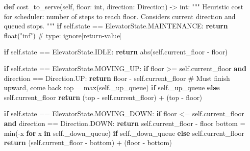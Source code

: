 \documentclass[11pt]{article}
\newenvironment{Shaded}{\begin{snugshade}}{\end{snugshade}}
\newcommand{\BuiltInTok}[1]{\textcolor[rgb]{0.50,0.55,0.55}{#1}}
\newcommand{\CommentTok}[1]{\textcolor[rgb]{0.48,0.49,0.49}{#1}}
\newcommand{\ControlFlowTok}[1]{\textcolor[rgb]{0.99,0.74,0.29}{\textbf{#1}}}
\newcommand{\KeywordTok}[1]{\textcolor[rgb]{0.81,0.81,0.76}{\textbf{#1}}}
\newcommand{\NormalTok}[1]{\textcolor[rgb]{0.81,0.81,0.76}{#1}}
\newcommand{\OperatorTok}[1]{\textcolor[rgb]{0.81,0.81,0.76}{#1}}
\newcommand{\StringTok}[1]{\textcolor[rgb]{0.96,0.31,0.31}{#1}}
\newcommand{\VariableTok}[1]{\textcolor[rgb]{0.15,0.68,0.68}{#1}}
\begin{document}
\begin{Shaded}
\begin{Highlighting}[]
    \KeywordTok{def}\NormalTok{ cost\_to\_serve(}\VariableTok{self}\NormalTok{, floor: }\BuiltInTok{int}\NormalTok{, direction: Direction) }\OperatorTok{{-}\textgreater{}} \BuiltInTok{int}\NormalTok{:}
        \CommentTok{"""}
\CommentTok{        Heuristic cost for scheduler: number of steps to reach \textasciigrave{}floor\textasciigrave{}.}
\CommentTok{        Considers current direction and queued stops.}
\CommentTok{        """}
        \ControlFlowTok{if} \VariableTok{self}\NormalTok{.state }\OperatorTok{==}\NormalTok{ ElevatorState.MAINTENANCE:}
            \ControlFlowTok{return} \BuiltInTok{float}\NormalTok{(}\StringTok{"inf"}\NormalTok{)  }\CommentTok{\# type: ignore[return{-}value]}

        \ControlFlowTok{if} \VariableTok{self}\NormalTok{.state }\OperatorTok{==}\NormalTok{ ElevatorState.IDLE:}
            \ControlFlowTok{return} \BuiltInTok{abs}\NormalTok{(}\VariableTok{self}\NormalTok{.current\_floor }\OperatorTok{{-}}\NormalTok{ floor)}

        \ControlFlowTok{if} \VariableTok{self}\NormalTok{.state }\OperatorTok{==}\NormalTok{ ElevatorState.MOVING\_UP:}
            \ControlFlowTok{if}\NormalTok{ floor }\OperatorTok{\textgreater{}=} \VariableTok{self}\NormalTok{.current\_floor }\KeywordTok{and}\NormalTok{ direction }\OperatorTok{==}\NormalTok{ Direction.UP:}
                \ControlFlowTok{return}\NormalTok{ floor }\OperatorTok{{-}} \VariableTok{self}\NormalTok{.current\_floor}
            \CommentTok{\# Must finish upward, come back}
\NormalTok{            top }\OperatorTok{=} \BuiltInTok{max}\NormalTok{(}\VariableTok{self}\NormalTok{.\_up\_queue) }\ControlFlowTok{if} \VariableTok{self}\NormalTok{.\_up\_queue }\ControlFlowTok{else} \VariableTok{self}\NormalTok{.current\_floor}
            \ControlFlowTok{return}\NormalTok{ (top }\OperatorTok{{-}} \VariableTok{self}\NormalTok{.current\_floor) }\OperatorTok{+}\NormalTok{ (top }\OperatorTok{{-}}\NormalTok{ floor)}

        \ControlFlowTok{if} \VariableTok{self}\NormalTok{.state }\OperatorTok{==}\NormalTok{ ElevatorState.MOVING\_DOWN:}
            \ControlFlowTok{if}\NormalTok{ floor }\OperatorTok{\textless{}=} \VariableTok{self}\NormalTok{.current\_floor }\KeywordTok{and}\NormalTok{ direction }\OperatorTok{==}\NormalTok{ Direction.DOWN:}
                \ControlFlowTok{return} \VariableTok{self}\NormalTok{.current\_floor }\OperatorTok{{-}}\NormalTok{ floor}
\NormalTok{            bottom }\OperatorTok{=} \BuiltInTok{min}\NormalTok{(}\OperatorTok{{-}}\NormalTok{x }\ControlFlowTok{for}\NormalTok{ x }\KeywordTok{in} \VariableTok{self}\NormalTok{.\_down\_queue) }\ControlFlowTok{if} \VariableTok{self}\NormalTok{.\_down\_queue }\ControlFlowTok{else} \VariableTok{self}\NormalTok{.current\_floor}
            \ControlFlowTok{return}\NormalTok{ (}\VariableTok{self}\NormalTok{.current\_floor }\OperatorTok{{-}}\NormalTok{ bottom) }\OperatorTok{+}\NormalTok{ (floor }\OperatorTok{{-}}\NormalTok{ bottom)}


\end{Highlighting}
\end{Shaded}
\end{document}
